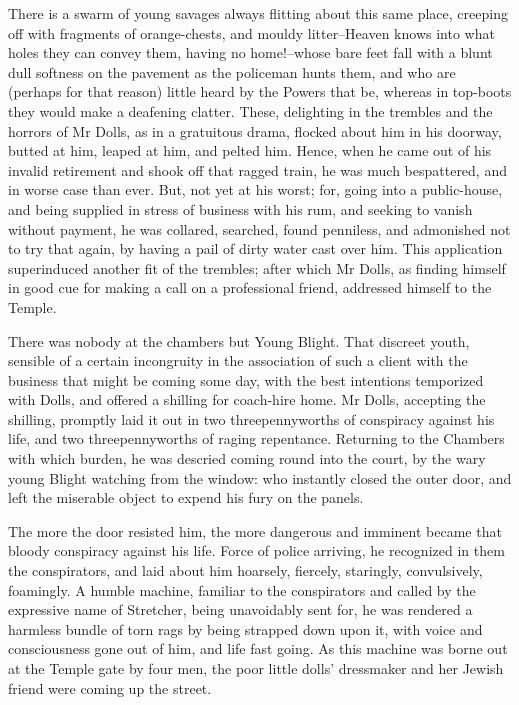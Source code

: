 There is a swarm of young savages always flitting about this same place,
creeping off with fragments of orange-chests, and mouldy litter--Heaven
knows into what holes they can convey them, having no home!--whose bare
feet fall with a blunt dull softness on the pavement as the policeman
hunts them, and who are (perhaps for that reason) little heard by
the Powers that be, whereas in top-boots they would make a deafening
clatter. These, delighting in the trembles and the horrors of Mr Dolls,
as in a gratuitous drama, flocked about him in his doorway, butted
at him, leaped at him, and pelted him. Hence, when he came out of
his invalid retirement and shook off that ragged train, he was much
bespattered, and in worse case than ever. But, not yet at his worst;
for, going into a public-house, and being supplied in stress of business
with his rum, and seeking to vanish without payment, he was collared,
searched, found penniless, and admonished not to try that again,
by having a pail of dirty water cast over him. This application
superinduced another fit of the trembles; after which Mr Dolls, as
finding himself in good cue for making a call on a professional friend,
addressed himself to the Temple.

There was nobody at the chambers but Young Blight. That discreet youth,
sensible of a certain incongruity in the association of such a
client with the business that might be coming some day, with the best
intentions temporized with Dolls, and offered a shilling for coach-hire
home. Mr Dolls, accepting the shilling, promptly laid it out in
two threepennyworths of conspiracy against his life, and two
threepennyworths of raging repentance. Returning to the Chambers with
which burden, he was descried coming round into the court, by the wary
young Blight watching from the window: who instantly closed the outer
door, and left the miserable object to expend his fury on the panels.

The more the door resisted him, the more dangerous and imminent became
that bloody conspiracy against his life. Force of police arriving,
he recognized in them the conspirators, and laid about him hoarsely,
fiercely, staringly, convulsively, foamingly. A humble machine, familiar
to the conspirators and called by the expressive name of Stretcher,
being unavoidably sent for, he was rendered a harmless bundle of torn
rags by being strapped down upon it, with voice and consciousness gone
out of him, and life fast going. As this machine was borne out at the
Temple gate by four men, the poor little dolls’ dressmaker and her
Jewish friend were coming up the street.

